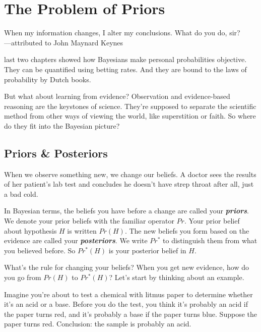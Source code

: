 \documentclass[justified]{tufte-book}
\newcommand{\p}{Pr}
\newcommand{\pr}{Pr}
\newcommand{\po}{Pr^*}
\newenvironment{epigraph}%
{
\begin{flushright}    
\begin{minipage}{20em}
\begin{flushright}
\itshape
}%
{
\end{flushright}
\end{minipage}
\end{flushright}
}
\theoremstyle{definition}
\theoremstyle{definition}
\theoremstyle{definition}
\theoremstyle{definition}
\theoremstyle{remark}
\begin{document}
\hypertarget{priors}{%
\chapter{The Problem of Priors}\label{priors}}

\begin{epigraph}
When my information changes, I alter my conclusions. What do you do,
sir?\\
---attributed to John Maynard Keynes
\end{epigraph}

 last two chapters showed how Bayesians make personal probabilities objective. They can be quantified using betting rates. And they are bound to the laws of probability by Dutch books.

But what about learning from evidence? Observation and evidence-based reasoning are the keystones of science. They're supposed to separate the scientific method from other ways of viewing the world, like superstition or faith. So where do they fit into the Bayesian picture?

\hypertarget{priors-posteriors}{%
\section{Priors \& Posteriors}\label{priors-posteriors}}

When we observe something new, we change our beliefs. A doctor sees the results of her patient's lab test and concludes he doesn't have strep throat after all, just a bad cold.

In Bayesian terms, the beliefs you have before a change are called your \textbf{\emph{priors}}. We denote your prior beliefs with the familiar operator \(\pr\). Your prior belief about hypothesis \(H\) is written \(\p(H)\). The new beliefs you form based on the evidence are called your \textbf{\emph{posteriors}}. We write \(\po\) to distinguish them from what you believed before. So \(\po(H)\) is your posterior belief in \(H\).

What's the rule for changing your beliefs? When you get new evidence, how do you go from \(\pr(H)\) to \(\po(H)\)? Let's start by thinking about an example.

Imagine you're about to test a chemical with litmus paper to determine whether it's an acid or a base. Before you do the test, you think it's probably an acid if the paper turns red, and it's probably a base if the paper turns blue. Suppose the paper turns red. Conclusion: the sample is probably an acid.
\end{document}
